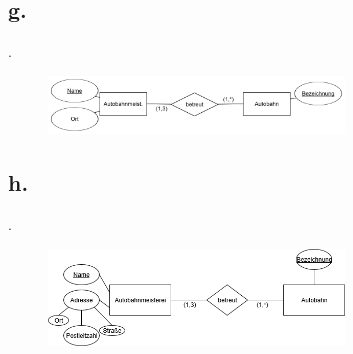 \documentclass{article}
\begin{document}
		
		\pagebreak
		
		\subsection*{g.}
		.
			\begin{figure}[h]
				\includegraphics[width=0.7\textwidth]{aufgabe_1_2_g.png}
			\end{figure}
		
		\subsection*{h.}
		.
				\begin{figure}[h]
					\includegraphics[width=0.7\textwidth]{aufgabe_1_2_h.png}
				\end{figure}
		
\end{document}
